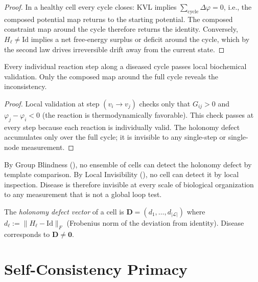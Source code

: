 \documentclass[twocolumn,11pt,a4paper]{article}
\newcommand{\HolL}{H_\ell}
\newcommand{\Dvec}{\mathbf{D}}
\begin{document}
\begin{proof}
In a healthy cell every cycle closes: KVL implies
$\sum_{\text{cycle}} \Delta\varphi = 0$, i.e., the composed potential map
returns to the starting potential. The composed constraint map around the
cycle therefore returns the identity. Conversely, $\HolL \neq \mathrm{Id}$
implies a net free-energy surplus or deficit around the cycle, which by
the second law drives irreversible drift away from the current state.
\end{proof}

\begin{theorem}\label{thm:invisible}
Every individual reaction step along a diseased cycle passes local
biochemical validation. Only the composed map around the full cycle
reveals the inconsistency.
\end{theorem}

\begin{proof}
Local validation at step $(v_i\to v_j)$ checks only that
$G_{ij} > 0$ and $\varphi_j - \varphi_i < 0$ (the reaction is thermodynamically
favorable). This check passes at every step because each reaction is
individually valid. The holonomy defect accumulates only over the full cycle;
it is invisible to any single-step or single-node measurement.
\end{proof}

\begin{corollary}\label{cor:organ-invisible}
By Group Blindness (), no ensemble of cells can
detect the holonomy defect by template comparison. By Local Invisibility
(), no cell can detect it by local inspection.
Disease is therefore invisible at every scale of biological organization
to any measurement that is not a global loop test.
\end{corollary}

\begin{definition}\label{def:disease-vec}
The \emph{holonomy defect vector} of a cell is
$\Dvec = (d_1, \ldots, d_{|\mathcal{L}|})$ where
$d_\ell := \|\HolL - \mathrm{Id}\|_F$ (Frobenius norm of the deviation
from identity). Disease corresponds to $\Dvec \neq \mathbf{0}$.
\end{definition}

\section{Self-Consistency Primacy}
\label{sec:primacy}
\end{document}
